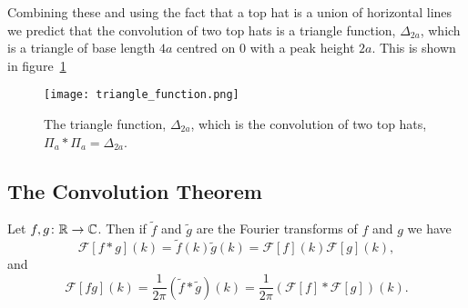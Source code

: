\documentclass[a4paper]{article}
\newcommand{\FT}{\mathcal{F}}
\newcommand{\convolution}{\mathbin{*}}
\begin{document}
\begin{example}
        Combining these and using the fact that a top hat is a union of horizontal lines we predict that the convolution of two top hats is a triangle function, \(\Delta_{2a}\), which is a triangle of base length \(4a\) centred on 0 with a peak height \(2a\).
        This is shown in figure~\ref{fig:triangle function}
        \begin{figure}[ht]
            \centering
            \texttt{[image: triangle\_function.png]}
            \caption{The triangle function, \(\Delta_{2a}\), which is the convolution of two top hats, \(\Pi_a\convolution\Pi_a = \Delta_{2a}\).}
            \label{fig:triangle function}
        \end{figure}
    \end{example}
    
    \subsection{The Convolution Theorem}
    \begin{theorem}
        Let \(f, g\colon\mathbb{R}\to\mathbb{C}\).
        Then if \(\tilde{f}\) and \(\tilde{g}\) are the Fourier transforms of \(f\) and \(g\) we have
        \[\FT[f\convolution g](k) = \tilde{f}(k)\tilde{g}(k) = \FT[f](k)\FT[g](k),\]
        and
        \[\FT[fg](k) = \frac{1}{2\pi}(\tilde{f}\convolution \tilde{g})(k) = \frac{1}{2\pi}(\FT[f]\convolution \FT[g])(k).\]
    \end{theorem}
\end{document}
